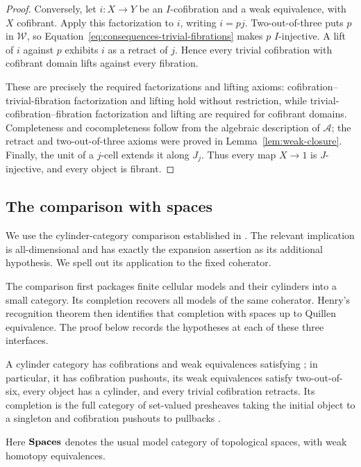 \begin{proof}
Conversely, let \(i:X\to Y\) be an \(I\)-cofibration and a weak
equivalence, with \(X\) cofibrant.  Apply this factorization to \(i\),
writing \(i=pj\).  Two-out-of-three puts \(p\) in \(\mathcal W\),
so Equation~\eqref{eq:consequences-trivial-fibrations} makes \(p\)
\(I\)-injective.  A lift of \(i\) against \(p\) exhibits \(i\)
as a retract of \(j\).  Hence every trivial cofibration with
cofibrant domain lifts against every fibration.

These are precisely the required factorizations and lifting axioms:
cofibration--trivial-fibration factorization and lifting hold without
restriction, while trivial-cofibration--fibration factorization and
lifting are required for cofibrant domains.  Completeness and
cocompleteness follow from the algebraic description of \(\mathcal A\);
the retract and two-out-of-three axioms were proved in
Lemma~\ref{lem:weak-closure}.  Finally, the unit of a \(j\)-cell
extends it along \(J_j\).  Thus every map \(X\to 1\) is
\(J\)-injective, and every object is fibrant.
\end{proof}

\subsection{The comparison with spaces}

We use the cylinder-category comparison established in
\cite[Sections~5.1 and~5.3]{Henry2016}.  The relevant implication is
all-dimensional and has exactly the expansion assertion as its
additional hypothesis.  We spell out its application to the fixed
coherator.

The comparison first packages finite cellular models and their
cylinders into a small category.  Its completion recovers all models
of the same coherator.  Henry's recognition theorem then identifies
that completion with spaces up to Quillen equivalence.  The proof
below records the hypotheses at each of these three interfaces.

A cylinder category has cofibrations and weak equivalences satisfying
\cite[Definition~2.1.1]{Henry2016}; in particular, it has cofibration
pushouts, its weak equivalences satisfy two-out-of-six, every object
has a cylinder, and every trivial cofibration retracts.  Its completion
is the full category of set-valued presheaves taking the initial object
to a singleton and cofibration pushouts to pullbacks
\cite[Definition~2.4.1]{Henry2016}.

Here \(\mathbf{Spaces}\) denotes the usual model category of topological spaces,
with weak homotopy equivalences.

